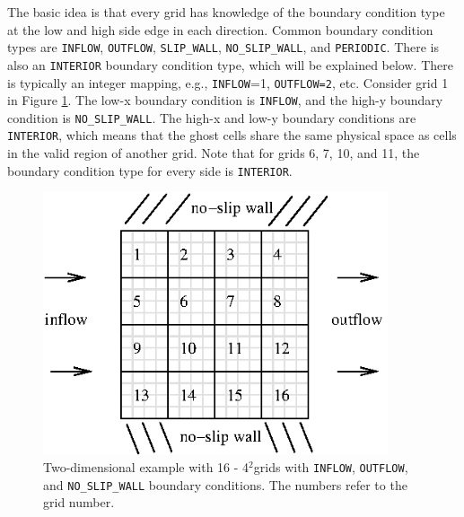 The basic idea is that every grid has knowledge of the
boundary condition type at the low and high side edge in each direction.
Common boundary condition types are {\tt INFLOW}, {\tt OUTFLOW}, {\tt SLIP\_WALL},
{\tt NO\_SLIP\_WALL}, and {\tt PERIODIC}.
There is also an {\tt INTERIOR} boundary condition type, which 
will be explained below.  There is typically an integer mapping, e.g., {\tt INFLOW}=1,
{\tt OUTFLOW=2}, etc.  Consider grid 1 in Figure \ref{fig:bc_example1}.  The
low-x boundary condition is {\tt INFLOW}, and the high-y boundary condition is
{\tt NO\_SLIP\_WALL}.  The high-x and low-y boundary conditions are {\tt INTERIOR}, which
means that the ghost cells share the same physical space as cells in the valid region of 
another grid.  Note that for grids 6, 7, 10, and 11, the boundary condition type for
every side is {\tt INTERIOR}.
\begin{figure}[tb]
\centering
\includegraphics[width=4in]{./AdvancedTopics/bc_example1}
\caption{\label{fig:bc_example1}Two-dimensional example with 16 - 4$^2$grids with
{\tt INFLOW}, {\tt OUTFLOW}, and {\tt NO\_SLIP\_WALL} boundary conditions.
The numbers refer to the grid number.}
\end{figure}

